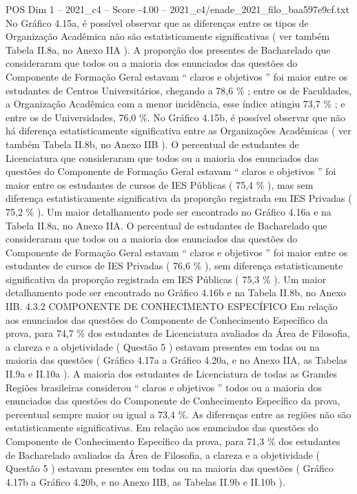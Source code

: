 \begin{textsample}{POS Dim 1 – 2021\_c4 – Score -4.00 – 2021\_c4/enade\_2021\_filo\_baa597e9cf.txt}
No Gráfico 4.15a, é possível observar que as diferenças entre os tipos de Organização Acadêmica não são estatisticamente significativas ( ver também Tabela II.8a, no Anexo IIA ).
A proporção dos presentes de Bacharelado que consideraram que todos ou a maioria dos enunciados das questões do Componente de Formação Geral estavam “ claros e objetivos ” foi maior entre os estudantes de Centros Universitários, chegando a 78,6 \% ; entre os de Faculdades, a Organização Acadêmica com a menor incidência, esse índice atingiu 73,7 \% ; e entre os de Universidades, 76,0 \%.
No Gráfico 4.15b, é possível observar que não há diferença estatisticamente significativa entre as Organizações Acadêmicas ( ver também Tabela II.8b, no Anexo IIB ).
O percentual de estudantes de Licenciatura que consideraram que todos ou a maioria dos enunciados das questões do Componente de Formação Geral estavam “ claros e objetivos ” foi maior entre os estudantes de cursos de IES Públicas ( 75,4 \% ), mas sem diferença estatisticamente significativa da proporção registrada em IES Privadas ( 75,2 \% ).
Um maior detalhamento pode ser encontrado no Gráfico 4.16a e na Tabela II.8a, no Anexo IIA.
O percentual de estudantes de Bacharelado que consideraram que todos ou a maioria dos enunciados das questões do Componente de Formação Geral estavam “ claros e objetivos ” foi maior entre os estudantes de cursos de IES Privadas ( 76,6 \% ), sem diferença estatisticamente significativa da proporção registrada em IES Públicas ( 75,3 \% ).
Um maior detalhamento pode ser encontrado no Gráfico 4.16b e na Tabela II.8b, no Anexo IIB. 4.3.2 COMPONENTE DE CONHECIMENTO ESPECÍFICO Em relação aos enunciados das questões do Componente de Conhecimento Específico da prova, para 74,7 \% dos estudantes de Licenciatura avaliados da Área de Filosofia, a clareza e a objetividade ( Questão 5 ) estavam presentes em todas ou na maioria das questões ( Gráfico 4.17a a Gráfico 4.20a, e no Anexo IIA, as Tabelas II.9a e II.10a ).
A maioria dos estudantes de Licenciatura de todas as Grandes Regiões brasileiras considerou “ claros e objetivos ” todos ou a maioria dos enunciados das questões do Componente de Conhecimento Específico da prova, percentual sempre maior ou igual a 73,4 \%.
As diferenças entre as regiões não são estatisticamente significativas.
Em relação aos enunciados das questões do Componente de Conhecimento Específico da prova, para 71,3 \% dos estudantes de Bacharelado avaliados da Área de Filosofia, a clareza e a objetividade ( Questão 5 ) estavam presentes em todas ou na maioria das questões ( Gráfico 4.17b a Gráfico 4.20b, e no Anexo IIB, as Tabelas II.9b e II.10b ).

\end{textsample}
